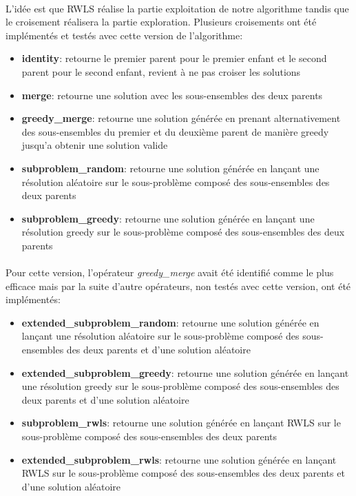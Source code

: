 \documentclass[a4paper,11pt,twoside,french,report]{../common/simplem}
\begin{document}
				\paragraph*{}
					L'idée est que \gls{RWLS} réalise la partie exploitation de notre algorithme tandis que le croisement réalisera la partie exploration. Plusieurs croisements ont été implémentés et testés avec cette version de l'algorithme:
					\begin{itemize}
						\item \textbf{identity}: retourne le premier parent pour le premier enfant et le second parent pour le second enfant, revient à ne pas croiser les solutions
						\item \textbf{merge}: retourne une solution avec les sous-ensembles des deux parents
						\item \textbf{greedy\_merge}: retourne une solution générée en prenant alternativement des sous-ensembles du premier et du deuxième parent de manière greedy jusqu'a obtenir une solution valide
						\item \textbf{subproblem\_random}: retourne une solution générée en lançant une résolution aléatoire sur le sous-problème composé des sous-ensembles des deux parents
						\item \textbf{subproblem\_greedy}: retourne une solution générée en lançant une résolution greedy sur le sous-problème composé des sous-ensembles des deux parents
					\end{itemize}
				\paragraph*{}
					Pour cette version, l'opérateur \textit{greedy\_merge} avait été identifié comme le plus efficace mais par la suite d'autre opérateurs, non testés avec cette version, ont été implémentés:
					\begin{itemize}
						\item \textbf{extended\_subproblem\_random}: retourne une solution générée en lançant une résolution aléatoire sur le sous-problème composé des sous-ensembles des deux parents et d'une solution aléatoire
						\item \textbf{extended\_subproblem\_greedy}: retourne une solution générée en lançant une résolution greedy sur le sous-problème composé des sous-ensembles des deux parents et d'une solution aléatoire
						\item \textbf{subproblem\_rwls}: retourne une solution générée en lançant \gls{RWLS} sur le sous-problème composé des sous-ensembles des deux parents
						\item \textbf{extended\_subproblem\_rwls}: retourne une solution générée en lançant RWLS sur le sous-problème composé des sous-ensembles des deux parents et d'une solution aléatoire
					\end{itemize}
\end{document}
